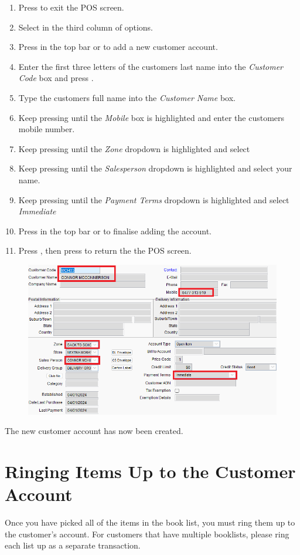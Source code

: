 \documentclass[a4paper, 12pt]{article}
\begin{document}
\begin{enumerate}
    \item Press \keys{\esc} to exit the POS screen.
    \item Select  in the third column of options.
    \item Press  in the top bar or  to add a new customer account.
    \item Enter the first three letters of the customers last name into the \textit{Customer Code} box and press \keys{\enter}.
    \item Type the customers full name into the \textit{Customer Name} box.
    \item Keep pressing \keys{\enter} until the \textit{Mobile} box is highlighted and enter the customers mobile number.
    \item Keep pressing \keys{\enter} until the \textit{Zone} dropdown is highlighted and select 
    \item Keep pressing \keys{\enter} until the \textit{Salesperson} dropdown is highlighted and select your name.
    \item Keep pressing \keys{\enter} until the \textit{Payment Terms} dropdown is highlighted and select \textit{Immediate}
    \item Press  in the top bar or  to finalise adding the account.
    \item Press \keys{\esc}, then press  to return the the POS screen.
\end{enumerate}
\begin{figure}[ht]
    \centering
    \includegraphics[width=0.8\linewidth]{images/customeraccount.png} 
\end{figure}
The new customer account has now been created.

\clearpage
\newpage
\section{Ringing Items Up to the Customer Account}
Once you have picked all of the items in the book list, you must ring them up to the customer's account. For customers that have multiple booklists, please ring each list up as a separate transaction.
\end{document}
